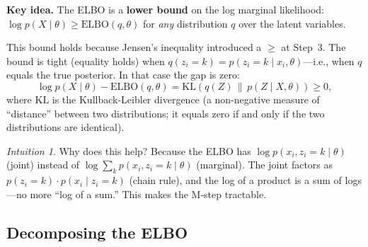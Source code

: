 \documentclass[11pt]{article}
\theoremstyle{definition}
\theoremstyle{plain}
\theoremstyle{remark}
\newtheorem{intuition}{Intuition}[section]
\newcommand{\KL}{\mathrm{KL}}
\newenvironment{keyidea}{\par\medskip\noindent\textbf{Key idea.} }{\par\medskip}
\begin{document}
\begin{keyidea}
The ELBO is a \textbf{lower bound} on the log marginal likelihood:
$\log p(X\mid\theta)\geq\mathrm{ELBO}(q,\theta)$ for \emph{any} distribution $q$ over the latent variables.

This bound holds because Jensen's inequality introduced a $\geq$ at Step~3. The bound is tight (equality holds) when $q(z_i=k)=p(z_i=k\mid x_i,\theta)$---i.e., when $q$ equals the true posterior. In that case the gap is zero:
\begin{equation}
  \log p(X\mid\theta) - \mathrm{ELBO}(q,\theta) = \KL(q(Z)\,\|\,p(Z\mid X,\theta)) \geq 0,
\end{equation}
where $\KL$ is the Kullback-Leibler divergence (a non-negative measure of ``distance'' between two distributions; it equals zero if and only if the two distributions are identical).
\end{keyidea}

\begin{intuition}
Why does this help? Because the ELBO has $\log p(x_i,z_i=k\mid\theta)$ (joint) instead of $\log\sum_k p(x_i,z_i=k\mid\theta)$ (marginal). The joint factors as $p(z_i=k)\cdot p(x_i\mid z_i=k)$ (chain rule), and the log of a product is a sum of logs---no more ``log of a sum.'' This makes the M-step tractable.
\end{intuition}

\subsection{Decomposing the ELBO}
\end{document}
